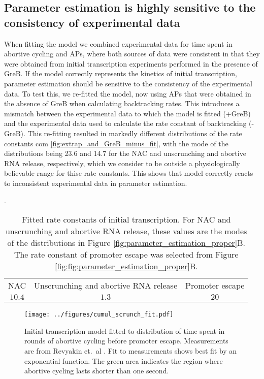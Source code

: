 \subsection{Parameter estimation is highly sensitive to the consistency of experimental data}
When fitting the model we combined experimental data for time spent in
abortive cycling and APs, where both sources of data were consistent in that
they were obtained from initial transcription experiments performed in the
presence of GreB. If the model correctly represents the kinetics of initial
transcription, parameter estimation should be sensitive to the consistency of
the experimental data. To test this, we re-fitted the model, now using APs
that were obtained in the absence of GreB when calculating backtracking rates.
This introduces a mismatch between the experimental data to which the model is
fitted (+GreB) and the experimental data used to calculate the rate constant
of backtracking (-GreB). This re-fitting resulted in markedly different
distributions of the rate constants com \ref{fig:extrap_and_GreB_minus_fit},
with the mode of the distributions being 23.6 and 14.7 for the NAC and
unscrunching and abortive RNA release, respectively, which we consider to be
outside a physiologically believable range for thise rate constants. This
shows that model correctly reacts to inconsistent experimental data in
parameter estimation.

\begin{table}
  \label{tab:param_fit_revyakin}
  \caption{Fitted rate constants of initial transcription. For NAC and
  unscrunching and abortive RNA release, these values are the modes of the
  distributions in Figure \ref{fig:parameter_estimation_proper}B. The rate constant of
  promoter escape was selected from Figure
\ref{fig:fig:parameter_estimation_proper}B.}.
  \begin{center}
    \begin{tabular}{ccc}
       \toprule
       NAC & Unscrunching and abortive RNA release & Promoter escape \\
       $10.4$ & $1.3$ & $20$ \\
    \end{tabular}
  \end{center}
\end{table}


\begin{figure}
    \begin{center}
      \texttt{[image: ../figures/cumul\_scrunch\_fit.pdf]}
    \end{center}
    \caption{Initial transcription model fitted to distribution of time spent
      in rounds of abortive cycling before promoter escape. Measurements are
      from Revyakin et.\ al \cite{revyakin_abortive_2006}. Fit to measurements
      shows best fit by an exponential function. The green area indicates the
      region where abortive cycling lasts shorter than one second.}
\label{fig:revyakin_fit}
\end{figure}



